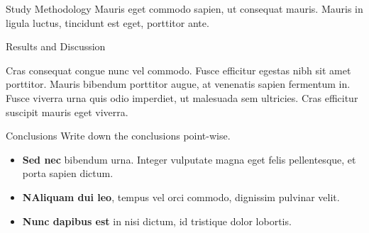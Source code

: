 \documentclass[final]{beamer}
\newlength{\colwidth}
\begin{document}
\begin{frame}[t]
\begin{columns}[t]
\begin{column}{\colwidth}
\begin{block}{Study Methodology}
    Mauris eget commodo sapien, ut consequat mauris. Mauris in ligula luctus, tincidunt est eget, porttitor ante.




  \end{block}



\begin{block}{Results and Discussion}

    Cras consequat congue nunc vel commodo. Fusce efficitur egestas nibh sit amet porttitor. Mauris bibendum porttitor augue, at venenatis sapien fermentum in. Fusce viverra urna quis odio imperdiet, ut malesuada sem ultricies. Cras efficitur suscipit mauris eget viverra.

    


\end{block}


\begin{block}{Conclusions}
    Write down the conclusions point-wise.
    \begin{itemize}
      \item \textbf{Sed nec} bibendum urna. Integer vulputate magna eget felis pellentesque, et porta sapien dictum.  
      \item \textbf{NAliquam dui leo}, tempus vel orci commodo, dignissim pulvinar velit. 
      \item \textbf{Nunc dapibus est} in nisi dictum, id tristique dolor lobortis.  
    \end{itemize}


\end{block}
\end{column}
\end{columns}
\end{frame}
\end{document}
